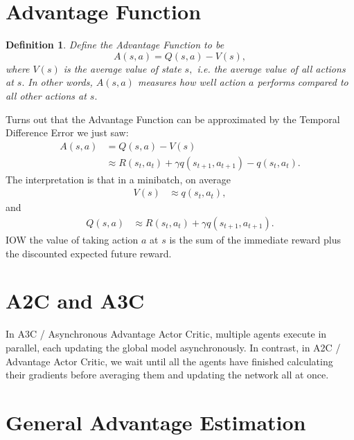 \documentclass[12pt]{article}
\theoremstyle{plain}
\newtheorem{definition}[theorem]{Definition}
\theoremstyle{definition}
\theoremstyle{remark}
\newcommand{\0}{\varnothing}
\newcommand{\g}{\gamma}
\newcommand{\<}{\langle}
\renewcommand{\>}{\rangle}
\begin{document}
\section{Advantage Function}

\begin{definition}
Define the Advantage Function to be \[
A(s, a) = Q(s, a) - V(s),
\]
where $ V(s) $ is the average value of state $ s, $ i.e. the average value of all actions at $ s. $ In other words, $ A(s, a) $ measures how well action $ a $ performs compared to all other actions at $ s. $
\end{definition}

Turns out that the Advantage Function can be approximated by the Temporal Difference Error we just saw: \begin{align*}
    A(s, a) &= Q(s, a) - V(s) \\
    &\approx R(s_t, a_t) + \g q(s_{t+1}, a_{t+1}) - q(s_t, a_t).
\end{align*}
The interpretation is that in a minibatch, on average \begin{align*}
    V(s) &\approx q(s_t, a_t),
\end{align*}
and
\begin{align*}
    Q(s, a) &\approx R(s_t, a_t) + \g q(s_{t+1}, a_{t+1}).
\end{align*}
IOW the value of taking action $ a $ at $ s $ is the sum of the immediate reward plus the discounted expected future reward.

\section{A2C and A3C}

In A3C / Asynchronous Advantage Actor Critic, multiple agents execute in parallel, each updating the global model asynchronously. In contrast, in A2C / Advantage Actor Critic, we wait until all the agents have finished calculating their gradients before averaging them and updating the network all at once.

\section{General Advantage Estimation}
\end{document}
